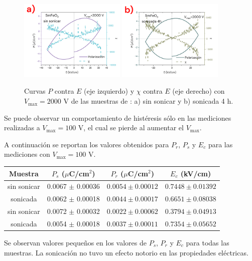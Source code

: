 \documentclass[../main.tex]{subfiles}
\begin{document}
\begin{figure}[H]
    \centering
    \includegraphics[width=0.45\textwidth]{fig/PESmFeO32000V.png}
    \quad
    \includegraphics[width=0.45\textwidth]{fig/PESmFeO3-S2000V.png}
    \caption{Curvas $P$ contra $E$ (eje izquierdo) y $\chi$ contra $E$ (eje derecho) con $V_\text{max}=2000$ V de las muestras de \sama{}: a) sin sonicar y b) sonicada 4 h.}
    \label{fig:sm2000v}
\end{figure}
Se puede observar un comportamiento de histéresis sólo en las mediciones realizadas a $V_\text{max}=100$ V, el cual se pierde al aumentar el $V_\text{max}$.

A continuación se reportan los valores obtenidos para $P_r$, $P_s$ y $E_c$ para las mediciones con $V_\text{max}=100$ V.

\begin{table}[H]
    \centering
    \begin{tabular}{|c||c|c|c|}
        \hline
        Muestra & $P_s$ ($\mu$C/cm$^2$) & $P_r$ ($\mu$C/cm$^2$) & $E_c$ (kV/cm) \\
        \hline\hline
        \neod{} sin sonicar & 0.0067 $\pm$ 0.00036 & $0.0054 \pm 0.00012$ & $0.7448 \pm 0.01392$ \\
        \hline
        \neod{} sonicada & 0.0062 $\pm$ 0.00018 & $0.0044 \pm 0.00017$ & $0.6651 \pm 0.08038$ \\
        \hline
        \sama{} sin sonicar & 0.0072 $\pm$ 0.00032 & $0.0022 \pm 0.00062$ & $0.3794 \pm 0.04913$ \\
        \hline
        \sama{} sonicada & 0.0054 $\pm$ 0.00018 & $0.0037 \pm 0.00011$ & $0.7354 \pm 0.05652$ \\
        \hline
        \end{tabular} 
    \label{tabla:respolar}
\end{table}
Se observan valores pequeños en los valores de $P_s$, $P_r$ y $E_c$ para todas las muestras. La sonicación no tuvo un efecto notorio en las propiedades eléctricas.
\end{document}
